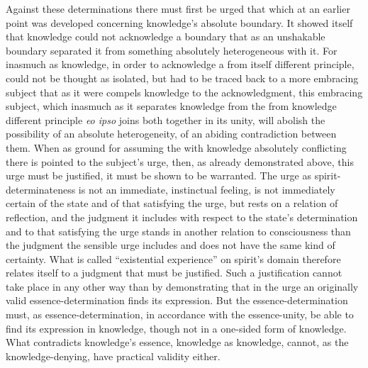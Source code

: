 \documentclass[12pt,a4paper]{book}
\begin{document}
Against these determinations there must first be urged that which at an earlier point was developed concerning
knowledge's absolute boundary. It showed itself that knowledge could not acknowledge a boundary that as an
unshakable boundary separated it from something absolutely heterogeneous with it. For inasmuch as knowledge, in
order to acknowledge a from itself different principle, could not be thought as isolated, but had to be traced
back to a more embracing subject that as it were compels knowledge to the acknowledgment, this embracing subject,
which inasmuch as it separates knowledge from the from knowledge different principle \textit{eo ipso} joins both
together in its unity, will abolish the possibility of an absolute heterogeneity, of an abiding contradiction
between them. When as ground for assuming the with knowledge absolutely conflicting there is pointed to the
subject's urge, then, as already demonstrated above, this urge must be justified, it must be shown to be
warranted. The urge as spirit-determinateness is not an immediate, instinctual feeling, is not immediately
certain of the state and of that satisfying the urge, but rests on a relation of reflection, and the judgment it
includes with respect to the state's determination and to that satisfying the urge stands in another relation to
consciousness than the judgment the sensible urge includes and does not have the same kind of certainty. What is
called ``existential experience'' on spirit's domain therefore relates itself to a judgment that must be
justified. Such a justification cannot take place in any other way than by demonstrating that in the urge an
originally valid essence-determination finds its expression. But the essence-determination must, as
essence-determination, in accordance with the essence-unity, be able to find its expression in knowledge, though
not in a one-sided form of knowledge. What contradicts knowledge's essence, knowledge as knowledge, cannot, as the
knowledge-denying, have practical validity either.
\end{document}

